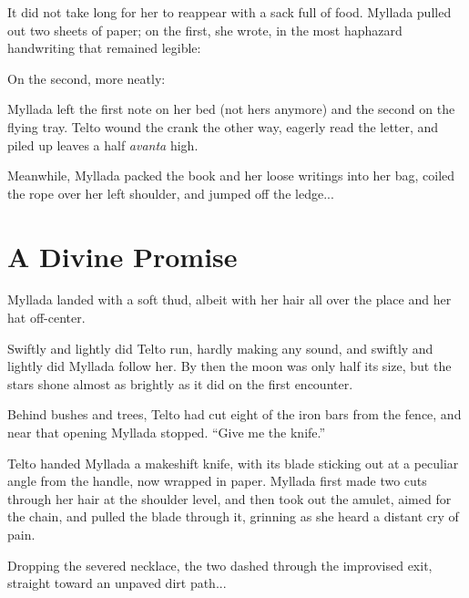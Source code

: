 It did not take long for her to reappear with a sack full of food. Myllada pulled out two sheets of paper; on the first, she wrote, in the most haphazard handwriting that remained legible:


On the second, more neatly:


Myllada left the first note on her bed (not hers anymore) and the second on the flying tray. Telto wound the crank the other way, eagerly read the letter, and piled up leaves a half \emph{avanta} high.

Meanwhile, Myllada packed the book and her loose writings into her bag, coiled the rope over her left shoulder, and jumped off the ledge...

\chapter{A Divine Promise}

Myllada landed with a soft thud, albeit with her hair all over the place and her hat off-center.

Swiftly and lightly did Telto run, hardly making any sound, and swiftly and lightly did Myllada follow her. By then the moon was only half its size, but the stars shone almost as brightly as it did on the first encounter.

Behind bushes and trees, Telto had cut eight of the iron bars from the fence, and near that opening Myllada stopped. ``Give me the knife.''

Telto handed Myllada a makeshift knife, with its blade sticking out at a peculiar angle from the handle, now wrapped in paper. Myllada first made two cuts through her hair at the shoulder level, and then took out the amulet, aimed for the chain, and pulled the blade through it, grinning as she heard a distant cry of pain.

Dropping the severed necklace, the two dashed through the improvised exit, straight toward an unpaved dirt path...

